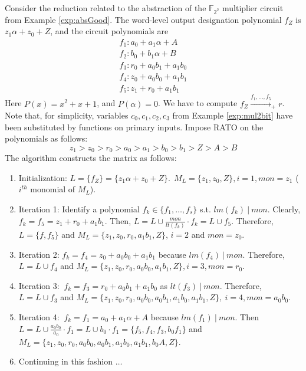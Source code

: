 \begin{Example}
\label{ex:f4}
Consider the reduction related to the abstraction of the 
${\mathbb{F}}_{2^2}$
multiplier circuit from Example \ref{exp:absGood}. The word-level output 
designation polynomial $f_Z$ is $z_1\alpha+z_0+Z$, and the circuit 
polynomials are
\begin{eqnarray}
f_1:a_0 + a_1 \alpha + A \nonumber \\
f_2:b_0 + b_1 \alpha + B \nonumber \\
f_3:r_0 + a_0b_1 + a_1b_0 \nonumber \\
f_4:z_0 + a_0b_0 + a_1b_1 \nonumber \\
f_5:z_1 + r_0 +a_1b_1 \nonumber
\end{eqnarray}
Here  $P(x) = x^2 + x + 1$, and  $P(\alpha) = 0$. We have to compute
$f_Z \xrightarrow{f_1, \dots, f_5}_+r$.  Note that, for simplicity, 
variables $c_0, c_1, c_2, c_3$ from Example \ref{exp:mul2bit} have been
substituted by functions on primary inputs. Impose RATO on the polynomials
as follows:
\begin{equation}
z_1 > z_0 > r_0 > a_0 > a_1 > b_0 > b_1 > Z > A > B
\end{equation}
The algorithm constructs the matrix as follows:  

\begin{enumerate}

\item Initialization: $L = \{f_Z\} = \{z_1\alpha+z_0+Z\}. ~~M_L = \{z_1, z_0, Z\}, i =
  1, mon = z_1$ ($i^{th}$ monomial of $M_L$).
\item Iteration 1: Identify a polynomial $f_k \in \{f_1,\dots,f_s\}$ s.t. $lm(f_k) ~|~
  mon$. Clearly, $f_k = f_5 =z_1 + r_0 +a_1b_1$. Then, $L = L \cup
  \frac{mon}{lt(f_k)} \cdot f_k = L \cup f_5$. Therefore, $L = \{f,
  f_5\}$ and $M_L = \{z_1, z_0, r_0, a_1b_1, Z\}$, $ i = 2$ and $mon = z_0$.
\item Iteration 2: $f_k = f_4 = z_0 + a_0b_0 + a_1b_1$ because $lm(f_4) ~|~
  mon$. Therefore, $L = L \cup f_4$
  and $M_L = \{z_1, z_0, r_0, a_0b_0, a_1b_1, Z\}, i =
  3, mon = r_0$. 
\item Iteration 3: $~f_k = f_3 = r_0 + a_0b_1 + a_1b_0$ as $lt(f_3)
  ~|~ mon$. Therefore, $L = L \cup f_3$ and 
  $M_L = \{z_1, z_0, r_0, a_0b_0, a_0b_1, a_1b_0, a_1b_1, Z\}, ~i = 4, mon = a_0b_0$.
\item Iteration 4: $~f_k = f_1 = a_0 + a_1 \alpha + A$ because
$lm(f_1) ~|~ mon$. Then $L = L \cup \frac{a_0b_0}{a_0} \cdot f_1 = L \cup
b_0\cdot f_1=\{f_5,f_4,f_3,b_0f_1\}$ and $M_L = \{z_1, z_0, r_0, a_0b_0, a_0b_1, a_1b_0, a_1b_1, b_0A, Z\}$.
\item Continuing in this fashion $\dots$ 


\end{enumerate}
\end{Example}
